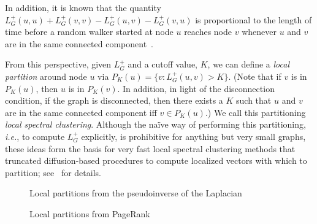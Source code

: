 \documentclass[12pt]{article}
\theoremstyle{plain}
\begin{document}
In addition, it is known that the
quantity $L_G^{+} (u,u) + L_G^{+} (v,v) - L_G^{+} (u,v) - L_G^{+} (v,u)$ is
proportional to the length of time before a random walker started at
node $u$ reaches node $v$ whenever $u$ and $v$ are in the same
connected component~\cite{chandra1989electrical}.  

From this perspective, given $L_G^{+}$ and a cutoff value, $K$, we can 
define a \emph{local partition} around node $u$ via 
$P_K(u) = \{ v : L_G^{+}(u,v) > K \}$.  
(Note that if $v$ is in $P_K(u)$, then $u$ is in $P_K(v)$.  In addition, in 
light of the disconnection condition, if the graph is disconnected, then 
there exists a $K$ such that $u$ and $v$ are in the same connected component 
iff $v \in P_K(u)$.)  
We call this partitioning \emph{local spectral clustering}.
Although the na\"{i}ve way of performing this partitioning, \emph{i.e.}, to 
compute $L_G^{+}$ explicitly, is prohibitive for anything but very small 
graphs, these ideas form the basis for very fast local spectral clustering 
methods that truncated diffusion-based procedures to compute localized 
vectors with which to partition; 
see~\cite{Spielman:2004,andersen06local,Chung07_heatkernelPNAS,MOV09_TRv2} 
for details.

\begin{figure}
    \centering
    \caption{Local partitions from the pseudoinverse of the Laplacian}
\end{figure}
\begin{figure}
    \centering
    \caption{Local partitions from PageRank}
\end{figure}
\end{document}
